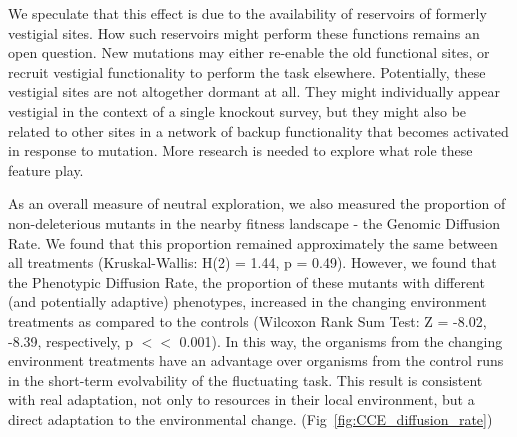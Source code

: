 \documentclass[10pt,letterpaper]{article}
\begin{document}
We speculate that this effect is due to the availability of reservoirs of formerly vestigial sites. How such reservoirs might perform these functions remains an open question. New mutations may either re-enable the old functional sites, or recruit vestigial functionality to perform the task elsewhere. Potentially, these vestigial sites are not altogether dormant at all. They might individually appear vestigial in the context of a single knockout survey, but they might also be related to other sites in a network of backup functionality that becomes activated in response to mutation. More research is needed to explore what role these feature play. 






As an overall measure of neutral exploration, we also measured the proportion of non-deleterious mutants in the nearby fitness landscape - the Genomic Diffusion Rate. We found that this proportion remained approximately the same between all treatments (Kruskal-Wallis: H(2) = 1.44, p = 0.49). However, we found that the Phenotypic Diffusion Rate, the proportion of these mutants with different (and potentially adaptive) phenotypes, increased in the changing environment treatments as compared to the controls (Wilcoxon Rank Sum Test: Z = -8.02, -8.39, respectively, p $<<$ 0.001). In this way, the organisms from the changing environment treatments have an advantage over organisms from the control runs in the short-term evolvability of the fluctuating task. This result is consistent with real adaptation, not only to resources in their local environment, but a direct adaptation to the environmental change. (Fig~\ref{fig:CCE_diffusion_rate})
\end{document}
